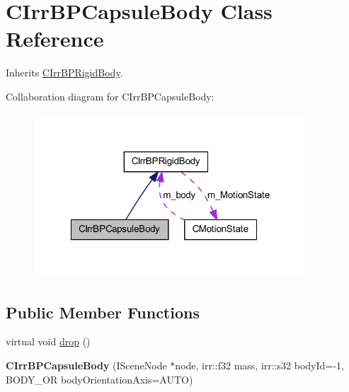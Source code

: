 \hypertarget{class_c_irr_b_p_capsule_body}{
\section{CIrrBPCapsuleBody Class Reference}
\label{class_c_irr_b_p_capsule_body}
}


Inherits \hyperlink{class_c_irr_b_p_rigid_body}{CIrrBPRigidBody}.



Collaboration diagram for CIrrBPCapsuleBody:\nopagebreak
\begin{figure}[H]
\begin{center}
\leavevmode
\includegraphics[width=291pt]{class_c_irr_b_p_capsule_body__coll__graph}
\end{center}
\end{figure}
\subsection*{Public Member Functions}
\begin{DoxyCompactItemize}
\item 
virtual void \hyperlink{class_c_irr_b_p_capsule_body_ab9815977583c6135b4b42dee8f536098}{drop} ()
\item 
\hypertarget{class_c_irr_b_p_capsule_body_a34a6ff788fddc82d0d9e7c836b6d38d3}{
{\bfseries CIrrBPCapsuleBody} (ISceneNode $\ast$node, irr::f32 mass, irr::s32 bodyId=-\/1, BODY\_\-OR bodyOrientationAxis=AUTO)}
\label{class_c_irr_b_p_capsule_body_a34a6ff788fddc82d0d9e7c836b6d38d3}

\end{DoxyCompactItemize}


